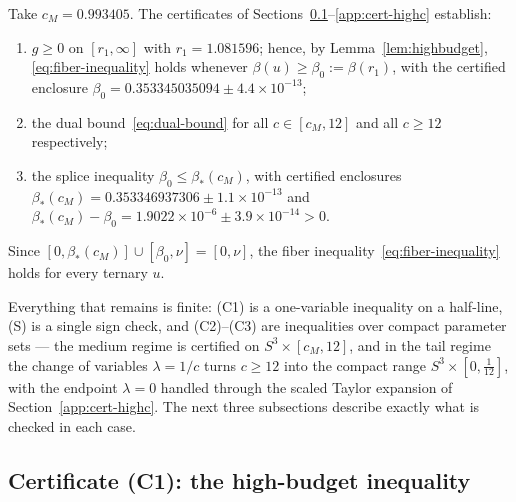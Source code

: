 \begin{proposition}[Coverage]\label{prop:fq1-coverage}
Take $c_M=0.993405$. The certificates of Sections~\ref{app:cert-highbeta}--\ref{app:cert-highc} establish:
\begin{enumerate}
\item[\textup{(C1)}] $g\ge0$ on $[r_1,\infty]$ with $r_1=1.081596$; hence, by Lemma~\ref{lem:highbudget}, \eqref{eq:fiber-inequality} holds whenever $\beta(u)\ge\beta_0:=\beta(r_1)$, with the certified enclosure $\beta_0=0.353345035094\pm4.4\times10^{-13}$;
\item[\textup{(C2)}, \textup{(C3)}] the dual bound~\eqref{eq:dual-bound} for all $c\in[c_M,12]$ and all $c\ge12$ respectively;
\item[\textup{(S)}] the splice inequality $\beta_0\le\beta_*(c_M)$, with certified enclosures $\beta_*(c_M)=0.353346937306\pm1.1\times10^{-13}$ and $\beta_*(c_M)-\beta_0=1.9022\times10^{-6}\pm3.9\times10^{-14}>0$.
\end{enumerate}
Since $[0,\beta_*(c_M)]\cup[\beta_0,\nu]=[0,\nu]$, the fiber inequality~\eqref{eq:fiber-inequality} holds for every ternary $u$.
\end{proposition}

Everything that remains is finite: (C1) is a one-variable inequality on a half-line, (S) is a single sign check, and (C2)--(C3) are inequalities over compact parameter sets --- the medium regime is certified on $S^3\times[c_M,12]$, and in the tail regime the change of variables $\lambda=1/c$ turns $c\ge12$ into the compact range $S^3\times[0,\tfrac1{12}]$, with the endpoint $\lambda=0$ handled through the scaled Taylor expansion of Section~\ref{app:cert-highc}. The next three subsections describe exactly what is checked in each case.

\subsection{Certificate (C1): the high-budget inequality}
\label{app:cert-highbeta}

